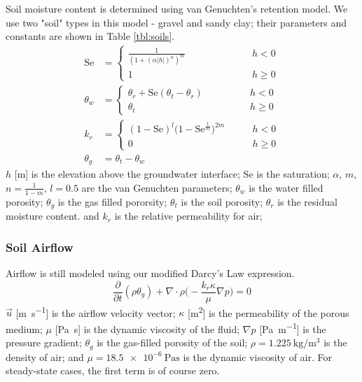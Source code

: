 Soil moisture content is determined using van Genuchten's retention model.
We use two "soil" types in this model - gravel and sandy clay; their parameters and constants are shown in Table \ref{tbl:soils}.
\begin{align*}
  \mathrm{Se} &=
    \begin{cases}
      \frac{1}{(1 + (\alpha |h|)^n)^m} & \quad\quad\quad\quad\quad\quad h < 0 \\
    1 & \quad\quad\quad\quad\quad\quad h \geq 0
    \end{cases}\\
  \theta_w &=
    \begin{cases}
      \theta_r + \mathrm{Se}(\theta_t - \theta_r) & \quad\quad\quad\quad h < 0 \\
      \theta_t & \quad\quad\quad\quad h \geq 0
    \end{cases}\\
    k_r &= \begin{cases}
        (1-\mathrm{Se})^l \big(1 - \mathrm{Se}^\frac{1}{m} \big)^{2m} & \quad\quad h < 0 \\
        0 & \quad\quad h \geq 0
      \end{cases}\\
    \theta_g &= \theta_t - \theta_w
\end{align*}
$h$ [\si{\metre}] is the elevation above the groundwater interface;
$\mathrm{Se}$ is the saturation;
$\alpha$, $m$, $n=\frac{1}{1-m}$, $l=0.5$ are the van Genuchten parameters;
$\theta_w$ is the water filled porosity;
$\theta_g$ is the gas filled pororsity;
$\theta_t$ is the soil porosity;
$\theta_r$ is the residual moisture content.
and $k_r$ is the relative permeability for air;

\subsubsection{Soil Airflow}

Airflow is still modeled using our modified Darcy's Law expression.
\begin{equation*}
  \frac{\partial}{\partial t} (\rho \theta_g) + \nabla \cdot \rho \Big( -\frac{k_r \kappa}{\mu} \nabla p \Big) = 0
\end{equation*}
$\vec{u}$ [\si{\m\per\second}] is the airflow velocity vector;
$\kappa$ [\si{\metre\squared}] is the permeability of the porous medium;
$\mu$ [\si{\pascal\second}] is the dynamic viscosity of the fluid;
$\nabla p$ [\si{\pascal\per\metre}] is the pressure gradient;
$\theta_g$ is the gas-filled porosity of the soil;
$\rho = \SI{1.225}{\kilogram\per\metre\cubed}$ is the density of air;
and $\mu = \SI{18.5e-6}{\pascal\second}$ is the dynamic viscosity of air.
For steady-state cases, the first term is of course zero.\par

